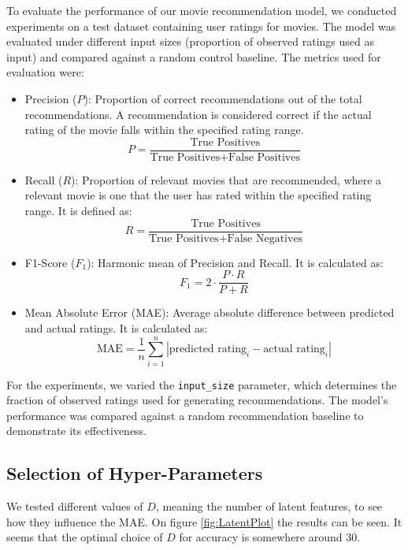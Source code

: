 \documentclass{article}
\begin{document}
To evaluate the performance of our movie recommendation model, we conducted experiments on a test dataset containing user ratings for movies. The model was evaluated under different input sizes (proportion of observed ratings used as input) and compared against a random control baseline. The metrics used for evaluation were:

\begin{itemize}
    \item Precision ($P$):
          Proportion of correct recommendations out of the total recommendations. A recommendation is considered correct if the actual rating of the movie falls within the specified rating range.
          \[ P = \frac{\text{True Positives}}{\text{True Positives} + \text{False Positives}} \]

    \item Recall ($R$): Proportion of relevant movies that are recommended, where a relevant movie is one that the user has rated within the specified rating range.
          It is defined as:
          \[ R = \frac{\text{True Positives}}{\text{True Positives} + \text{False Negatives}} \]

    \item F1-Score ($F_1$): Harmonic mean of Precision and Recall. It is calculated as:
          \[ F_1 = 2 \cdot \frac{P \cdot R}{P + R} \]

    \item Mean Absolute Error (MAE): Average absolute difference between predicted and actual ratings. It is calculated as:
          \[ \text{MAE} = \frac{1}{n} \sum_{i=1}^n | \text{predicted rating}_i - \text{actual rating}_i | \]
\end{itemize}

For the experiments, we varied the \texttt{input\_size} parameter, which determines the fraction of observed ratings used for generating recommendations. The model's performance was compared against a random recommendation baseline to demonstrate its effectiveness.

\subsection{Selection of Hyper-Parameters}
We tested different values of $D$, meaning the number of latent features, to see how they influence the MAE. On figure \ref{fig:LatentPlot} the results can be seen. It seems that the optimal choice of $D$ for accuracy is somewhere around 30.
\end{document}
